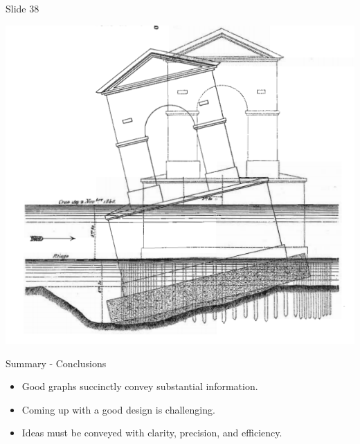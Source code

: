 \documentclass[
  ignorenonframetext,
]{beamer}
\begin{document}
\begin{frame}{Slide 38}
\protect\hypertarget{slide-38}{}
\begin{minipage}{0.45\textwidth}
\centering
\includegraphics[width=\textwidth]{excellence_figs/fig_35.png}
\end{minipage}
\hfill
\begin{minipage}{0.5\textwidth}
\footnotesize
Summary - Conclusions

\begin{itemize}
  \item Good graphs succinctly convey substantial information.
  \item Coming up with a good design is challenging.
  \item Ideas must be conveyed with clarity, precision, and efficiency.
\end{itemize}
\end{minipage}
\end{frame}
\end{document}
